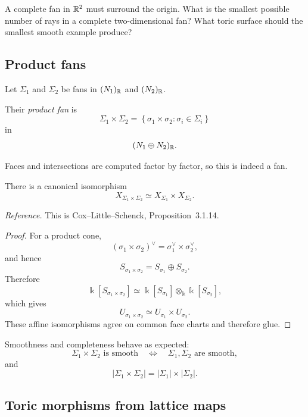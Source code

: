 \begin{prediction}
A complete fan in \(\mathbb{R}^2\) must surround the origin. What is the
smallest possible number of rays in a complete two-dimensional fan?
What toric surface should the smallest smooth example produce?
\end{prediction}

\subsection{Product fans}

Let \(\Sigma_1\) and \(\Sigma_2\) be fans in
\((N_1)_{\mathbb{R}}\) and \((N_2)_{\mathbb{R}}\).

\begin{definition}
Their \emph{product fan} is
\[
\Sigma_1\times\Sigma_2
=
\left\{
\sigma_1\times\sigma_2:
\sigma_i\in\Sigma_i
\right\}
\]
in
\[
(N_1\oplus N_2)_{\mathbb{R}}.
\]
\end{definition}

Faces and intersections are computed factor by factor, so this is
indeed a fan.

\begin{proposition}[Products]
\label{prop:product-fans}
There is a canonical isomorphism
\[
X_{\Sigma_1\times\Sigma_2}
\simeq
X_{\Sigma_1}\times X_{\Sigma_2}.
\]
\end{proposition}

\noindent
\textit{Reference.}
This is Cox--Little--Schenck, Proposition~3.1.14.

\begin{proof}
For a product cone,
\[
(\sigma_1\times\sigma_2)^\vee
=
\sigma_1^\vee\times\sigma_2^\vee,
\]
and hence
\[
S_{\sigma_1\times\sigma_2}
=
S_{\sigma_1}\oplus S_{\sigma_2}.
\]
Therefore
\[
\Bbbk[S_{\sigma_1\times\sigma_2}]
\simeq
\Bbbk[S_{\sigma_1}]
\otimes_\Bbbk
\Bbbk[S_{\sigma_2}],
\]
which gives
\[
U_{\sigma_1\times\sigma_2}
\simeq
U_{\sigma_1}\times U_{\sigma_2}.
\]
These affine isomorphisms agree on common face charts and therefore
glue.
\end{proof}

Smoothness and completeness behave as expected:
\[
\Sigma_1\times\Sigma_2\text{ is smooth}
\quad\Longleftrightarrow\quad
\Sigma_1,\Sigma_2\text{ are smooth},
\]
and
\[
|\Sigma_1\times\Sigma_2|
=
|\Sigma_1|\times|\Sigma_2|.
\]

\subsection{Toric morphisms from lattice maps}

